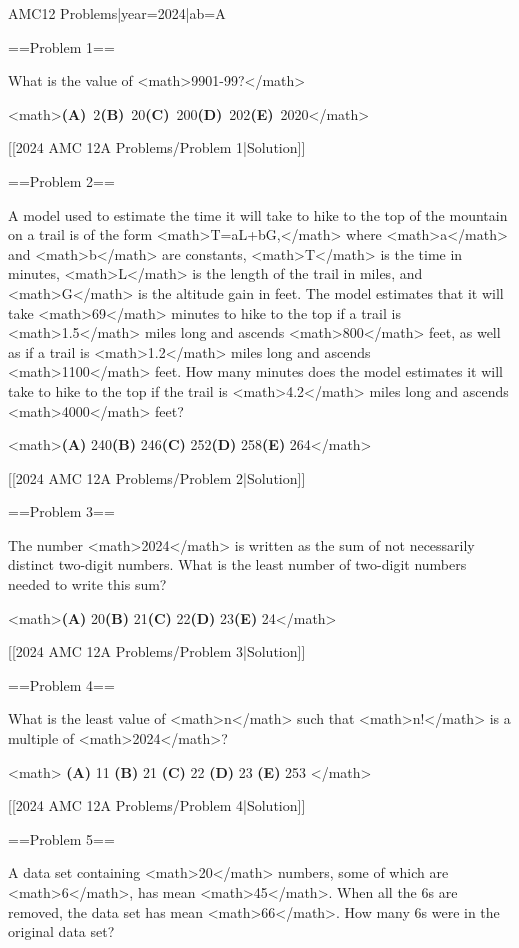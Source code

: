 {{AMC12 Problems|year=2024|ab=A}}

==Problem 1==

What is the value of <math>9901-99?</math>

<math>\textbf{(A)}~2\qquad\textbf{(B)}~20\qquad\textbf{(C)}~200\qquad\textbf{(D)}~202\qquad\textbf{(E)}~2020</math>

[[2024 AMC 12A Problems/Problem 1|Solution]]

==Problem 2==

A model used to estimate the time it will take to hike to the top of the mountain on a trail is of the form <math>T=aL+bG,</math> where <math>a</math> and <math>b</math> are constants, <math>T</math> is the time in minutes, <math>L</math> is the length of the trail in miles, and <math>G</math> is the altitude gain in feet. The model estimates that it will take <math>69</math> minutes to hike to the top if a trail is <math>1.5</math> miles long and ascends <math>800</math> feet, as well as if a trail is <math>1.2</math> miles long and ascends <math>1100</math> feet. How many minutes does the model estimates it will take to hike to the top if the trail is <math>4.2</math> miles long and ascends <math>4000</math> feet?

<math>\textbf{(A) }240\qquad\textbf{(B) }246\qquad\textbf{(C) }252\qquad\textbf{(D) }258\qquad\textbf{(E) }264</math>

[[2024 AMC 12A Problems/Problem 2|Solution]]

==Problem 3==

The number <math>2024</math> is written as the sum of not necessarily distinct two-digit numbers. What is the least number of two-digit numbers needed to write this sum?

<math>\textbf{(A) }20\qquad\textbf{(B) }21\qquad\textbf{(C) }22\qquad\textbf{(D) }23\qquad\textbf{(E) }24</math>

[[2024 AMC 12A Problems/Problem 3|Solution]]

==Problem 4==

What is the least value of <math>n</math> such that <math>n!</math> is a multiple of <math>2024</math>?

<math>
\textbf{(A) }11 \qquad
\textbf{(B) }21 \qquad
\textbf{(C) }22 \qquad
\textbf{(D) }23 \qquad
\textbf{(E) }253 \qquad
</math>

[[2024 AMC 12A Problems/Problem 4|Solution]]

==Problem 5==

A data set containing <math>20</math> numbers, some of which are <math>6</math>, has mean <math>45</math>. When all the 6s are removed, the data set has mean <math>66</math>. How many 6s were in the original data set?

